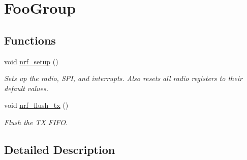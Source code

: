 \hypertarget{group___foo_group}{}\section{Foo\+Group}
\label{group___foo_group}
\subsection*{Functions}
\begin{DoxyCompactItemize}
\item 
void \hyperlink{group___foo_group_gaf022f4a6e0c8d5bfee1f88bc868759d6}{nrf\+\_\+setup} ()\hypertarget{group___foo_group_gaf022f4a6e0c8d5bfee1f88bc868759d6}{}\label{group___foo_group_gaf022f4a6e0c8d5bfee1f88bc868759d6}

\begin{DoxyCompactList}\small\item\em Sets up the radio, S\+PI, and interrupts. Also resets all radio registers to their default values. \end{DoxyCompactList}\item 
void \hyperlink{group___foo_group_ga0dbdc466783e7a7463a5b062c5153845}{nrf\+\_\+flush\+\_\+tx} ()\hypertarget{group___foo_group_ga0dbdc466783e7a7463a5b062c5153845}{}\label{group___foo_group_ga0dbdc466783e7a7463a5b062c5153845}

\begin{DoxyCompactList}\small\item\em Flush the TX F\+I\+FO. \end{DoxyCompactList}\end{DoxyCompactItemize}


\subsection{Detailed Description}
